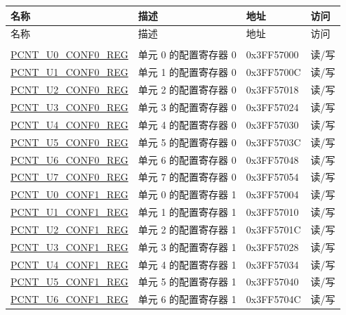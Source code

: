 
\begin{longtable}{ | l| l | l|l| }
\hline\rowcolor{lightgray}
名称 & 描述 &  地址 & 访问 \\ \hline
\endfirsthead
        \hline
        \rowcolor{lightgray}
       名称 & 描述 & 地址 & 访问  \\
        \hline
        \endhead
        \endfoot
\multicolumn{4}{|l|}{\textbf{配置寄存器}} \\ \hline
\hyperref[regdesc:PCNTUnCONF0REG]{PCNT\_U0\_CONF0\_REG} & 单元 0 的配置寄存器 0 & 0x3FF57000 & 读/写 \\ \hline
\hyperref[regdesc:PCNTUnCONF0REG]{PCNT\_U1\_CONF0\_REG} & 单元 1 的配置寄存器 0 & 0x3FF5700C & 读/写 \\ \hline
\hyperref[regdesc:PCNTUnCONF0REG]{PCNT\_U2\_CONF0\_REG} & 单元 2 的配置寄存器 0 & 0x3FF57018 & 读/写 \\ \hline
\hyperref[regdesc:PCNTUnCONF0REG]{PCNT\_U3\_CONF0\_REG} & 单元 3 的配置寄存器 0 & 0x3FF57024 & 读/写 \\ \hline
\hyperref[regdesc:PCNTUnCONF0REG]{PCNT\_U4\_CONF0\_REG} & 单元 4 的配置寄存器 0 & 0x3FF57030 & 读/写 \\ \hline
\hyperref[regdesc:PCNTUnCONF0REG]{PCNT\_U5\_CONF0\_REG} & 单元 5 的配置寄存器 0 & 0x3FF5703C & 读/写 \\ \hline
\hyperref[regdesc:PCNTUnCONF0REG]{PCNT\_U6\_CONF0\_REG} & 单元 6 的配置寄存器 0 & 0x3FF57048 & 读/写 \\ \hline
\hyperref[regdesc:PCNTUnCONF0REG]{PCNT\_U7\_CONF0\_REG} & 单元 7 的配置寄存器 0 & 0x3FF57054 & 读/写 \\ \hline
\hyperref[regdesc:PCNTUnCONF1REG]{PCNT\_U0\_CONF1\_REG} & 单元 0 的配置寄存器 1 & 0x3FF57004 & 读/写 \\ \hline
\hyperref[regdesc:PCNTUnCONF1REG]{PCNT\_U1\_CONF1\_REG} & 单元 1 的配置寄存器 1 & 0x3FF57010 & 读/写 \\ \hline
\hyperref[regdesc:PCNTUnCONF1REG]{PCNT\_U2\_CONF1\_REG} & 单元 2 的配置寄存器 1 & 0x3FF5701C & 读/写 \\ \hline
\hyperref[regdesc:PCNTUnCONF1REG]{PCNT\_U3\_CONF1\_REG} & 单元 3 的配置寄存器 1 & 0x3FF57028 & 读/写 \\ \hline
\hyperref[regdesc:PCNTUnCONF1REG]{PCNT\_U4\_CONF1\_REG} & 单元 4 的配置寄存器 1 & 0x3FF57034 & 读/写 \\ \hline
\hyperref[regdesc:PCNTUnCONF1REG]{PCNT\_U5\_CONF1\_REG} & 单元 5 的配置寄存器 1 & 0x3FF57040 & 读/写 \\ \hline
\hyperref[regdesc:PCNTUnCONF1REG]{PCNT\_U6\_CONF1\_REG} & 单元 6 的配置寄存器 1 & 0x3FF5704C & 读/写 \\ \hline

\end{longtable}
